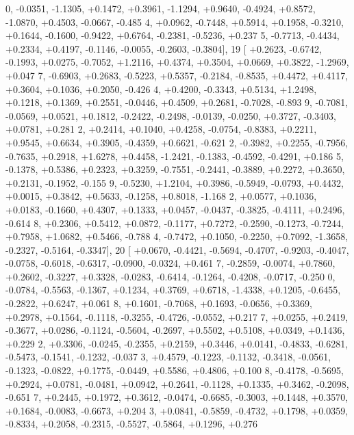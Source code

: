 \begin{DoxyCode}
      0, -0.0351, -1.1305, +0.1472, +0.3961, -1.1294, +0.9640, -0.4924, +0.8572, -1.0870, +0.4503, -0.0667, -0.485
      4, +0.0962, -0.7448, +0.5914, +0.1958, -0.3210, +0.1644, -0.1600, -0.9422, +0.6764, -0.2381, -0.5236, +0.237
      5, -0.7713, -0.4434, +0.2334, +0.4197, -0.1146, -0.0055, -0.2603, -0.3804],
19 [ +0.2623, -0.6742, -0.1993, +0.0275, -0.7052, +1.2116, +0.4374, +0.3504, +0.0669, +0.3822, -1.2969, +0.047
      7, -0.6903, +0.2683, -0.5223, +0.5357, -0.2184, -0.8535, +0.4472, +0.4117, +0.3604, +0.1036, +0.2050, -0.426
      4, +0.4200, -0.3343, +0.5134, +1.2498, +0.1218, +0.1369, +0.2551, -0.0446, +0.4509, +0.2681, -0.7028, -0.893
      9, -0.7081, -0.0569, +0.0521, +0.1812, -0.2422, -0.2498, -0.0139, -0.0250, +0.3727, -0.3403, +0.0781, +0.281
      2, +0.2414, +0.1040, +0.4258, -0.0754, -0.8383, +0.2211, +0.9545, +0.6634, +0.3905, -0.4359, +0.6621, -0.621
      2, -0.3982, +0.2255, -0.7956, -0.7635, +0.2918, +1.6278, +0.4458, -1.2421, -0.1383, -0.4592, -0.4291, +0.186
      5, -0.1378, +0.5386, +0.2323, +0.3259, -0.7551, -0.2441, -0.3889, +0.2272, +0.3650, +0.2131, -0.1952, -0.155
      9, -0.5230, +1.2104, +0.3986, -0.5949, -0.0793, +0.4432, +0.0015, +0.3842, +0.5633, -0.1258, +0.8018, -1.168
      2, +0.0577, +0.1036, +0.0183, -0.1660, +0.4307, +0.1333, +0.0457, -0.0437, -0.3825, -0.4111, +0.2496, -0.614
      8, +0.2306, +0.5412, +0.0872, -0.1177, +0.7272, -0.2590, -0.1273, -0.7244, +0.7958, +1.0682, +0.5466, -0.788
      4, -0.7472, +0.1050, -0.2250, +0.7092, -1.3658, -0.2327, -0.5164, -0.3347],
20 [ +0.0670, -0.4421, -0.5694, -0.4707, -0.9203, -0.4047, -0.0758, -0.6018, -0.6317, -0.0900, -0.0324, +0.461
      7, -0.2859, -0.0074, +0.7860, +0.2602, -0.3227, +0.3328, -0.0283, -0.6414, -0.1264, -0.4208, -0.0717, -0.250
      0, -0.0784, -0.5563, -0.1367, +0.1234, +0.3769, +0.6718, -1.4338, +0.1205, -0.6455, -0.2822, +0.6247, +0.061
      8, +0.1601, -0.7068, +0.1693, -0.0656, +0.3369, +0.2978, +0.1564, -0.1118, -0.3255, -0.4726, -0.0552, +0.217
      7, +0.0255, +0.2419, -0.3677, +0.0286, -0.1124, -0.5604, -0.2697, +0.5502, +0.5108, +0.0349, +0.1436, +0.229
      2, +0.3306, -0.0245, -0.2355, +0.2159, +0.3446, +0.0141, -0.4833, -0.6281, -0.5473, -0.1541, -0.1232, -0.037
      3, +0.4579, -0.1223, -0.1132, -0.3418, -0.0561, -0.1323, -0.0822, +0.1775, -0.0449, +0.5586, +0.4806, +0.100
      8, -0.4178, -0.5695, +0.2924, +0.0781, -0.0481, +0.0942, +0.2641, -0.1128, +0.1335, +0.3462, -0.2098, -0.651
      7, +0.2445, +0.1972, +0.3612, -0.0474, -0.6685, -0.3003, +0.1448, +0.3570, +0.1684, -0.0083, -0.6673, +0.204
      3, +0.0841, -0.5859, -0.4732, +0.1798, +0.0359, -0.8334, +0.2058, -0.2315, -0.5527, -0.5864, +0.1296, +0.276

\end{DoxyCode}
